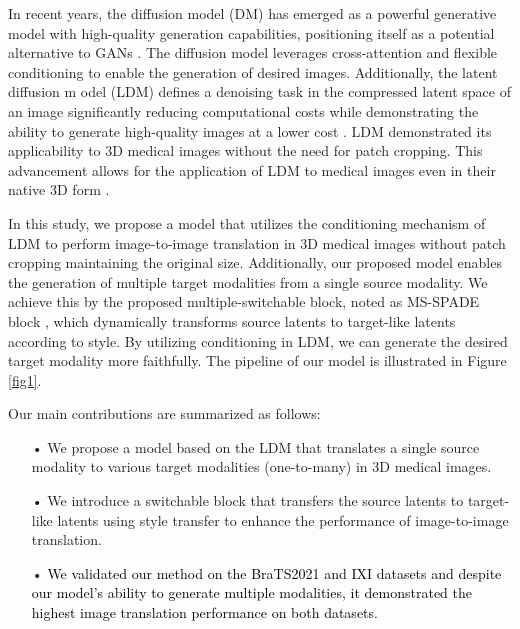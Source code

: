 \documentclass[10pt,twocolumn,letterpaper]{article}
\newcommand{\jhk}[2]{\textcolor{black}{{}#2}}
\begin{document}
In recent years, the diffusion model (DM) has emerged as a powerful generative model with high-quality generation capabilities, positioning itself as a potential alternative to  GANs \cite{ho2020denoising, dhariwal2021diffusion, saharia2022palette, rombach2022high, pinaya2022brain, croitoru2023diffusion}. The diffusion model leverages cross-attention and flexible conditioning to enable the generation of desired images. Additionally, the latent diffusion m odel (LDM) defines a denoising task in the compressed latent space of an image significantly reducing computational costs while demonstrating the ability to generate high-quality images at a lower cost \cite{rombach2022high}. LDM demonstrated its applicability to 3D medical images without the need for patch cropping. This advancement allows for the application of LDM to medical images even in their native 3D form \cite{khader2023denoising, pinaya2022brain}.



In this study, we propose a model that utilizes the conditioning mechanism of LDM to perform image-to-image translation in 3D medical images without patch cropping maintaining the original size. Additionally, our proposed model enables the generation of multiple target modalities from a single source modality. We achieve this by the proposed multiple-switchable block, noted as MS-SPADE block , which dynamically transforms source latents to target-like latents according to style. By utilizing conditioning in LDM, we can generate the desired target modality more faithfully. The pipeline of our model is illustrated in Figure \ref{fig1}.


Our main contributions are summarized as follows:
\begin{itemize}[nolistsep]
  \item[•] We propose a model based on the LDM that translates a single source modality to various target modalities (one-to-many) in 3D medical images.
  \item[•] We introduce a switchable block that transfers the source latents to target-like latents using style transfer to enhance the performance of image-to-image translation.
  \item[•] \jhk{}{We validated our method on the BraTS2021 and IXI datasets and despite our model's ability to generate multiple modalities, it demonstrated the highest image translation performance on both datasets.}
\end{itemize}
\end{document}
